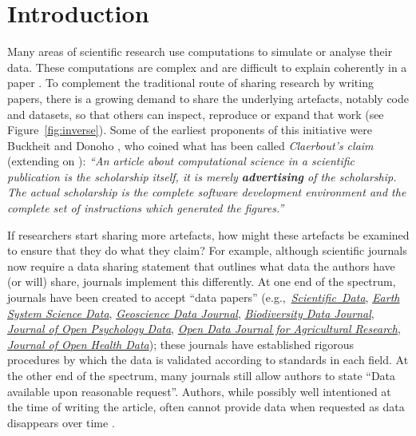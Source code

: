 \documentclass[12pt]{article}
\begin{document}
\clearpage

\section*{Introduction}\label{introduction}

Many areas of scientific research use computations to simulate or analyse their data. These computations are complex and are difficult to explain coherently in a paper \citep{marwick_how_2015}.
To complement the traditional route of sharing research by writing papers,
there is a growing demand to share the underlying artefacts, notably 
code and datasets, so that others can inspect, reproduce or expand that work
(see Figure~\ref{fig:inverse}).
Some of the earliest proponents of this initiative were Buckheit and Donoho \cite{buckheit_wavelab_1995}, who coined what has been called \emph{Claerbout's claim} (extending on \citet{claerbout_electronic_1992}):
\emph{``An article about computational science in a scientific publication 
is  the scholarship itself, it is merely \textbf{advertising} of
the scholarship. The actual scholarship is the complete software development
environment and the complete set of instructions which generated the 
figures.''}

If researchers start sharing more artefacts, how might these artefacts be examined to ensure that they do what they claim?
For example,
although  scientific journals now require a data sharing statement that
outlines what data the authors have (or will) share, journals  implement this differently.
At one end of the spectrum, journals have been created to accept ``data papers''
(e.g.,~\href{https://www.nature.com/sdata/}{\emph{Scientific~Data}}, 
\href{https://essd.copernicus.org/}{\emph{Earth System Science Data}}, 
\href{https://rmets.onlinelibrary.wiley.com/journal/20496060}{\emph{Geoscience Data Journal}},
\href{https://bdj.pensoft.net/}{\emph{Biodiversity Data Journal}},
\href{https://openpsychologydata.metajnl.com/}{\emph{Journal of Open Psychology Data}},
\href{https://odjar.org/}{\emph{Open Data Journal for Agricultural Research}},
\href{https://openhealthdata.metajnl.com}{\emph{Journal of Open Health Data}});
these journals have established rigorous procedures by which
the data is validated according to standards in each field.
At the other end of the spectrum, many journals still allow authors to state ``Data available upon reasonable request''.
Authors, while possibly well intentioned at the time of writing the article, often cannot provide data when requested as data disappears over time \cite{Vines2014-hf}.
\end{document}
